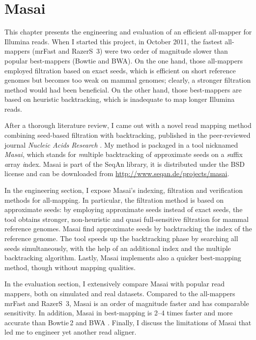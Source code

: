 \chapter{Masai}
\label{sec:masai}

This chapter presents the engineering and evaluation of an efficient all-mapper for Illumina reads.
When I started this project, in October 2011, the fastest all-mappers (mrFast and RazerS~3) were two order of magnitude slower than popular best-mappers (Bowtie and BWA).
On the one hand, those all-mappers employed filtration based on exact seeds, which is efficient on short reference genomes but becomes too weak on mammal genomes; clearly, a stronger filtration method would had been beneficial.
On the other hand, those best-mappers are based on heuristic backtracking, which is inadequate to map longer Illumina reads.

After a thorough literature review, I came out with a novel read mapping method combining seed-based filtration with backtracking, published in the peer-reviewed journal \emph{Nucleic Acids Research} \citep{Siragusa2013}.
My method is packaged in a \CC tool nicknamed \emph{Masai}, which stands for \emph{m}ultiple backtracking of \emph{a}pproximate seeds on a \emph{s}uffix \emph{a}rray \emph{i}ndex.
Masai is part of the SeqAn library, it is distributed under the BSD license and can be downloaded from \url{http://www.seqan.de/projects/masai}.

In the engineering section, I expose Masai's indexing, filtration and verification methods for all-mapping.
In particular, the filtration method is based on approximate seeds: by employing approximate seeds instead of exact seeds, the tool obtains stronger, non-heuristic and quasi full-sensitive filtration for mammal reference genomes.
Masai find approximate seeds by backtracking the index of the reference genome.
The tool speeds up the backtracking phase by searching all seeds simultaneously, with the help of an additional index and the multiple backtracking algorithm.
Lastly, Masai implements also a quicker best-mapping method, though without mapping qualities.

In the evaluation section, I extensively compare Masai with popular read mappers, both on simulated and real datasets.
Compared to the all-mappers mrFast and RazerS~3, Masai is an order of magnitude faster and has comparable sensitivity.
In addition, Masai in best-mapping is 2--4 times faster and more accurate than Bowtie\,2 \citep{Langmead2012} and BWA \citep{Li2009}.
Finally, I discuss the limitations of Masai that led me to engineer yet another read aligner.

